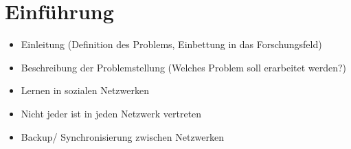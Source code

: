 
\chapter{Einführung}
\label{ch:introduction}

\begin{itemize}
\item Einleitung (Definition des Problems, Einbettung in das Forschungsfeld)
\item Beschreibung der Problemstellung (Welches Problem soll erarbeitet werden?)
\end{itemize}

\begin{itemize}
    \item Lernen in sozialen Netzwerken
    \item Nicht jeder ist in jeden Netzwerk vertreten
    \item Backup/ Synchronisierung zwischen Netzwerken
\end{itemize}
